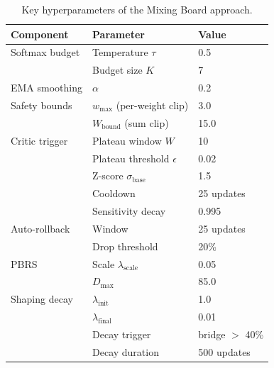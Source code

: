 \begin{table}[H]
\centering
\caption{Key hyperparameters of the Mixing Board approach.}
\label{tab:dyn_hyperparams}
\begin{tabular}{@{}lll@{}}
\toprule
\textbf{Component} & \textbf{Parameter} & \textbf{Value} \\
\midrule
Softmax budget   & Temperature $\tau$            & 0.5 \\
                 & Budget size $K$               & 7   \\
EMA smoothing    & $\alpha$                      & 0.2 \\
Safety bounds    & $w_{\max}$ (per-weight clip)   & 3.0 \\
                 & $W_{\text{bound}}$ (sum clip)  & 15.0 \\
Critic trigger   & Plateau window $W$            & 10  \\
                 & Plateau threshold $\epsilon$  & 0.02 \\
                 & Z-score $\sigma_{\text{base}}$ & 1.5 \\
                 & Cooldown                      & 25 updates \\
                 & Sensitivity decay             & 0.995 \\
Auto-rollback    & Window                        & 25 updates \\
                 & Drop threshold                & 20\% \\
PBRS             & Scale $\lambda_{\text{scale}}$ & 0.05 \\
                 & $D_{\max}$                    & 85.0 \\
Shaping decay    & $\lambda_{\text{init}}$       & 1.0 \\
                 & $\lambda_{\text{final}}$      & 0.01 \\
                 & Decay trigger                 & bridge $>$ 40\% \\
                 & Decay duration                & 500 updates \\
\bottomrule
\end{tabular}
\end{table}
